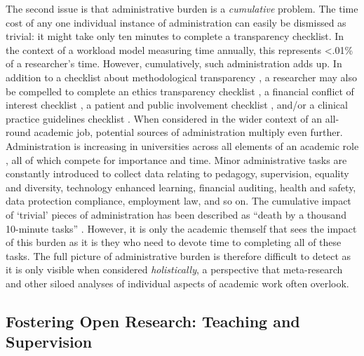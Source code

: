 \documentclass[ authordate, meta, issue]{jote-new-article}
\begin{document}
The second issue is that administrative burden is a \emph{cumulative} problem. The time cost of any one individual instance of administration can easily be dismissed as trivial: it might take only ten minutes to complete a transparency checklist. In the context of a workload model measuring time annually, this represents <.01\% of a researcher’s time. However, cumulatively, such administration adds up. In addition to a checklist about methodological transparency \parencites{Aczel2020}, a researcher may also be compelled to complete an ethics transparency checklist \parencites{Henry2018}, a financial conflict of interest checklist \parencites{Rochon2010}, a patient and public involvement checklist \parencites{Staniszewska2017}, and/or a clinical practice guidelines checklist \parencites{CruzRivera2020}. When considered in the wider context of an all-round academic job, potential sources of administration multiply even further. Administration is increasing in universities across all elements of an academic role \parencites{Hogan2011}, all of which compete for importance and time. Minor administrative tasks are constantly introduced to collect data relating to pedagogy, supervision, equality and diversity, technology enhanced learning, financial auditing, health and safety, data protection compliance, employment law, and so on. The cumulative impact of ‘trivial’ pieces of administration has been described as “death by a thousand 10-minute tasks” \parencites{Bozeman2021}. However, it is only the academic themself that sees the impact of this burden as it is they who need to devote time to completing all of these tasks. The full picture of administrative burden is therefore difficult to detect as it is only visible when considered \emph{holistically}, a perspective that meta-research and other siloed analyses of individual aspects of academic work often overlook.







\subsection{Fostering Open Research: Teaching and Supervision}
\end{document}
